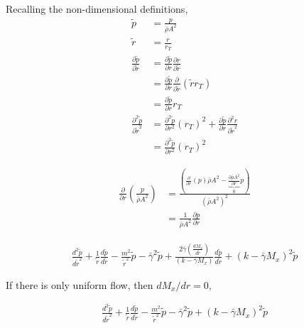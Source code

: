 Recalling the non-dimensional definitions,
\begin{align*}
    \tilde{p} &= \frac{p}{\bar{\rho} A^2} \\
    \tilde{r} &= \frac{r}{r_T} \\
    \frac{\partial \tilde{p}}{\partial \tilde{r}} &= 
    \frac{ \partial \tilde{p}}{\partial r} \frac{\partial r}{ \partial \tilde{r}}  \\ 
    &= \frac{ \partial \tilde{p}}{\partial r} \frac{\partial }{ \partial \tilde{r}} \left( \tilde{r} r_T \right) \\
    &= 
    \frac{ \partial \tilde{p}}{\partial r}  r_T \\
    \frac{\partial^2 \tilde{p}}{\partial \tilde{r}^2} &= 
    \frac{ \partial^2 \tilde{p}}{\partial r^2}  (r_T)^2+ 
    \frac{ \partial \tilde{p}}{\partial r} \frac{\partial^2 r}{ \partial \tilde{r}^2} \\
    &= \frac{ \partial^2 \tilde{p}}{\partial r^2}  (r_T)^2 
\end{align*}

\begin{align*}
    \frac{\partial}{\partial r} \left( \frac{p}{\bar{\rho} A^2} \right) 
    &=
    \frac{\left(\frac{\partial}{\partial r} \left(  p\right) \bar{\rho} A^2 - 
    \underbrace{\frac{\partial \bar{\rho}A^2}{\partial r}}_0 p \right)}{\left( \bar{\rho} A^2 \right)^2}\\ 
    &= \frac{1}{\bar{\rho}A^2} \frac{\partial p}{\partial r}
\end{align*}

\begin{align*}
    \frac{ d^2 \tilde{p}}{d \tilde{r}^2} +
    \frac{1}{\tilde{r}} 
    \frac{d \tilde{p}}{d \tilde{r}}- 
    \frac{m^2}{\tilde{r}^2}\tilde{p}- 
    \bar{\gamma}^2  \tilde{p}
 + 
    \frac{2 \bar{\gamma} \left( \frac{d M_x}{d \tilde{r}} \right)}
    {\left( k - \bar{\gamma} M_x \right)}\frac{d \tilde{p}}{d \tilde{r}}+
    \left( k - \bar{\gamma} M_x \right)^2\tilde{p} 
\end{align*}

If there is only uniform flow, then $dM_x/dr = 0$,

\begin{align*}
    \frac{ d^2 \tilde{p}}{d \tilde{r}^2} +
    \frac{1}{\tilde{r}} 
    \frac{d \tilde{p}}{d \tilde{r}}- 
    \frac{m^2}{\tilde{r}^2}\tilde{p}- 
    \bar{\gamma}^2  \tilde{p}
 + 
    \left( k - \bar{\gamma} M_x \right)^2\tilde{p} 
\end{align*}

